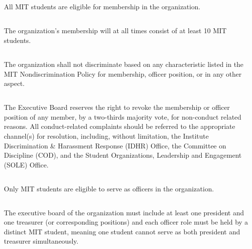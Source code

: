 \documentclass{bylaws}
\begin{document}
\label{art:mit-rules}

\subsection{}All MIT students are eligible for membership in the organization.
\subsection{}The organization's membership will at all times consist of at least 10 MIT students.
\subsection{}The organization shall not discriminate based on any characteristic listed in the MIT Nondiscrimination Policy for membership, officer position, or in any other aspect.
\subsection{}The Executive Board reserves the right to revoke the membership or officer position of any member, by a two-thirds majority vote, for non-conduct related reasons. All conduct-related complaints should be referred to the appropriate channel(s) for resolution, including, without limitation, the Institute Discrimination \& Harassment Response (IDHR) Office, the Committee on Discipline (COD), and the Student Organizations, Leadership and Engagement (SOLE) Office.

\subsection{}Only MIT students are eligible to serve as officers in the organization.
\subsection{}The executive board of the organization must include at least one president and one treasurer (or corresponding positions) and each officer role must be held by a distinct MIT student, meaning one student cannot serve as both president and treasurer simultaneously.
\end{document}
